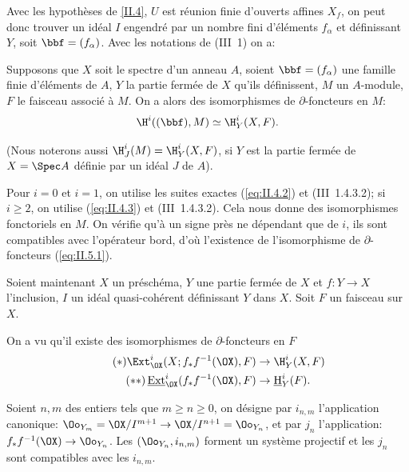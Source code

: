 Avec les hypoth\`eses de \eqref{II.4}, $U$ est r\'eunion finie d'ouverts affines $X_f$, on peut donc trouver un id\'eal $I$ engendr\'e par un nombre fini d'\'el\'ements $f_{\alpha}$ et d\'efinissant~$Y$, soit $\bbf=(f_{\alpha})$. Avec les notations de (\EGA III~1) on a:

\begin{supproposition} \label{II.5}
Supposons que $X$ soit le spectre d'un anneau $A$, soient $\bbf=(f_{\alpha})$ une famille finie d'\'el\'ements de $A$, $Y$ la partie ferm\'ee de $X$ qu'ils d\'efinissent, $M$ un $A$-module, $F$ le faisceau associ\'e \`a $M$. On a alors des isomorphismes de $\partial$-foncteurs en $M$:
\begin{equation} \label{eq:II.5.1} \H^i((\bbf), M) \simeq \H_Y^i(X, F).
\end{equation}
\end{supproposition}

\noindent
(Nous noterons aussi $\H_J^i(M)=\H_Y^i(X, F)$, si $Y$ est la partie ferm\'ee de $X=\Spec A$ d\'efinie par un id\'eal $J$ de $A$).

Pour $i=0$ et $i=1$, on utilise les suites exactes (\ref{eq:II.4.2}) et (\EGA III~1.4.3.2); si $i\geq2$, on utilise (\ref{eq:II.4.3}) et (\EGA III~1.4.3.2). Cela nous donne des isomorphismes fonctoriels en $M$. On v\'erifie qu'\`a un signe pr\`es ne d\'ependant que de $i$, ils sont compatibles avec l'op\'erateur bord, d'o\`u l'existence de l'isomorphisme de $\partial$-foncteurs (\ref{eq:II.5.1}).

Soient maintenant $X$ un pr\'esch\'ema, $Y$ une partie ferm\'ee de $X$ et $f:Y\to X$ l'inclusion, $I$ un id\'eal quasi-coh\'erent d\'efinissant $Y$ dans $X$. Soit $F$ un faisceau sur $X$.

On a vu qu'il existe des isomorphismes de $\partial$-foncteurs en $F$
\begin{align}
\label{eq:II.5.*} \tag{$*$} \Ext_{\OX}^i(X;f_{*}f^{-1}(\OX), F) &\to \H_Y^i(X, F) \\
\label{eq:II.5.**} \tag{$**$} \mathop{\underline{\mathrm{Ext}}}\nolimits_{\OX}^i(f_{*}f^{-1}(\OX), F) &\to \mathop{\underline{\mathrm{H}}}\nolimits_Y^i(F).
\end{align}

Soient $n, m$ des entiers tels que $m\geq n\geq 0$, on d\'esigne par $i_{n, m}$ l'application canonique: $\Oo_{Y_m}=\OX/I^{m+1} \to\OX/I^{n+1}=\Oo_{Y_n}$, et par $j_n$ l'application: $f_{*}f^{-1}(\OX)\to\Oo_{Y_n}$. Les $(\Oo_{Y_n}, i_{n, m})$ forment un syst\`eme projectif et les $j_n$ sont compatibles avec les $i_{n, m}$.

